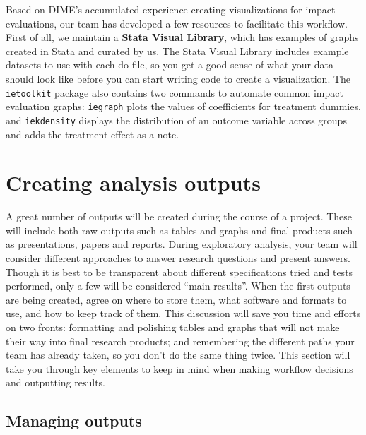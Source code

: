 Based on DIME's accumulated experience creating visualizations for impact evaluations, 
our team has developed a few resources to facilitate this workflow.
First of all, we maintain a \textbf{Stata Visual Library},
which has examples of graphs created in Stata and curated by us.
The Stata Visual Library includes example datasets to use with each do-file,
so you get a good sense of what your data should look like
before you can start writing code to create a visualization.
The \texttt{ietoolkit} package also contains two commands to automate
common impact evaluation graphs: 
\texttt{iegraph} plots the values of coefficients for treatment dummies,
and \texttt{iekdensity} displays the distribution of an outcome variable
across groups and adds the treatment effect as a note.


\section{Creating analysis outputs}

A great number of outputs will be created during the course of a project.
These will include both raw outputs such as tables and graphs
and final products such as presentations, papers and reports.
During exploratory analysis, your team will consider different approaches
to answer research questions and present answers.
Though it is best to be transparent about different
specifications tried and tests performed,
only a few will be considered ``main results''.
When the first outputs are being created, agree on where to store them,
what software and formats to use, and how to keep track of them.
This discussion will save you time and efforts on two fronts:
formatting and polishing tables and graphs that 
will not make their way into final research products;
and remembering the different paths your team has already
taken, so you don't do the same thing twice.
This section will take you through key elements to keep in mind 
when making workflow decisions and outputting results.


\subsection{Managing outputs}

